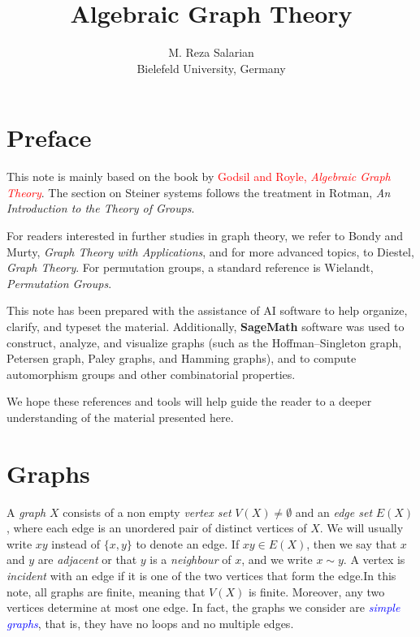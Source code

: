 \documentclass[12pt,a4paper,openany]{book}
\title{Algebraic Graph Theory}
\author{M. Reza Salarian\\Bielefeld University, Germany
}
\begin{document}
\maketitle

\chapter*{Preface}

This note is mainly based on the book by \textcolor{red}{ Godsil and Royle, \textit{Algebraic Graph Theory}}.  
The section on Steiner systems follows the treatment in Rotman, \textit{An Introduction to the Theory of Groups}.  

For readers interested in further studies in graph theory, we refer to Bondy and Murty, \textit{Graph Theory with Applications}, and for more advanced topics, to Diestel, \textit{Graph Theory}.  
For permutation groups, a standard reference is Wielandt, \textit{Permutation Groups}.  

\vspace{1em}
This note has been prepared with the assistance of AI software to help organize, clarify, and typeset the material.  
Additionally, \textbf{SageMath} software was used to construct, analyze, and visualize graphs (such as the Hoffman–Singleton graph, Petersen graph, Paley graphs, and Hamming graphs), and to compute automorphism groups and other combinatorial properties.  

We hope these references and tools will help guide the reader to a deeper understanding of the material presented here.





\tableofcontents


\chapter{Graphs}

A \emph{graph} $X$ consists of a non empty \emph{vertex set} $V(X)\neq \emptyset$ and an \emph{edge set} $E(X)$, 
where each edge is an unordered pair of distinct vertices of $X$. 
We will usually write $xy$ instead of $\{x,y\}$ to denote an edge.  
If $xy \in E(X)$, then we say that $x$ and $y$ are \emph{adjacent} or that $y$ is a \emph{neighbour} of $x$, and we write $x \sim y$.  
A vertex is \emph{incident} with an edge if it is one of the two vertices that form the edge.In this note, all graphs are finite, meaning that $V(X)$ is finite. Moreover, any two vertices determine at most one edge. In fact, the graphs we consider are \textcolor{blue}{\emph{simple graphs}}, that is, they have no loops and no multiple edges.
\end{document}
